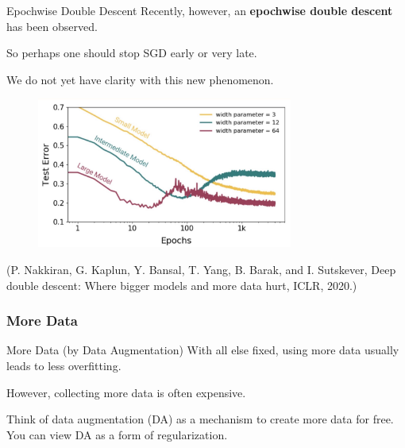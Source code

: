 \begin{frame}[allowframebreaks]

\begin{mydefinitionblock}{6.17}{Epochwise Double Descent}
    Recently, however, an \textbf{epochwise double descent} has been observed.

    So perhaps one should stop SGD early or very late.

    We do not yet have clarity with this new phenomenon.

    \begin{figure}[H]
        \centering
        \includegraphics[width=0.75\textwidth]{.././assets/6.8.jpg}
    \end{figure}

    (P. Nakkiran, G. Kaplun, Y. Bansal, T. Yang, B. Barak, and I. Sutskever, Deep double descent: Where bigger models and more data hurt, ICLR, 2020.)
\end{mydefinitionblock}

\end{frame}

\subsubsection{More Data}

\begin{frame}[allowframebreaks]

\begin{myconceptblock}{6.18}{More Data (by Data Augmentation)}
    With all else fixed, using more data usually leads to less overfitting.

    However, collecting more data is often expensive.

    Think of data augmentation (DA) as a mechanism to create more data for free. You can view DA as a form of regularization.
\end{myconceptblock}

\end{frame}

